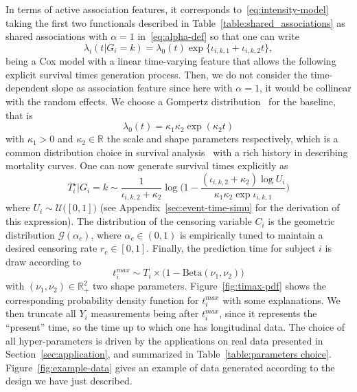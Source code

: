 \documentclass[11pt]{article}
\newcommand{\cG}{\mathcal G}
\newcommand{\cU}{\mathcal U}
\newcommand{\R}{\mathds R}
\begin{document}
In terms of active association features, it corresponds to~\eqref{eq:intensity-model} taking the first two functionals described in Table~\ref{table:shared_associations} as shared associations with $\alpha = 1$ in~\eqref{eq:alpha-def} so that one can write
\[ \lambda_i(t|G_i = k) = \lambda_0(t) \exp \big\{ \iota_{i,k,1} + \iota_{i,k,2} t \big\},\]
being a Cox model with a linear time-varying feature that allows the following explicit survival times generation process. Then, we do not consider the time-dependent slope as association feature since here with $\alpha = 1$, it would be collinear with the random effects.
We choose a Gompertz distribution~\citep{gompertz1825xxiv} for the baseline, that is
\begin{equation}
  \label{eq:baseline}
  \lambda_0(t) = \kappa_1 \kappa_2 \exp(\kappa_2t)
\end{equation}
with $\kappa_1 > 0$ and $\kappa_2 \in \R$ the scale and shape parameters respectively, which is a common distribution choice in survival analysis~\citep{klein2005survival} with a rich history in describing mortality curves. One can now generate survival times explicitly as
\begin{equation}
  \label{eq:time-generation}
  T_i^\star | G_i=k \sim \dfrac{1}{\iota_{i,k,2} + \kappa_2} \log \Big(1 - \dfrac{(\iota_{i,k,2} + \kappa_2) \log U_i}{\kappa_1 \kappa_2 \exp\iota_{i,k,1}} \Big)
\end{equation}
where $U_i \sim \cU\big([0,1]\big)$ (see Appendix~\ref{sec:event-time-simu} for the derivation of this expression).
The distribution of the censoring variable $C_i$ is the geometric distribution $\cG(\alpha_c)$, where $\alpha_c \in (0, 1)$ is empirically tuned to maintain a desired censoring rate $r_c \in [0,1]$. 
Finally, the prediction time for subject $i$ is draw according to 
\begin{equation}
  \label{eq:law-t_i^max}
  t_i^{max} \sim T_i \times \big(1 - \text{Beta}(\nu_1, \nu_2)\big) 
\end{equation}
with $(\nu_1, \nu_2) \in \R_+^2$ two shape parameters. Figure~\ref{fig:timax-pdf} shows the corresponding probability density function for $t_i^{max}$ with some explanations.
We then truncate all $Y_i$ measurements being after $t_i^{max}$, since it represents the ``present'' time, so the time up to which one has longitudinal data.
The choice of all hyper-parameters is driven by the applications on real data presented in Section~\ref{sec:application}, and summarized in Table~\ref{table:parameters choice}. Figure~\ref{fig:example-data} gives an example of data generated according to the design we have just described.
\end{document}
